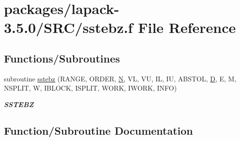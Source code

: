 \hypertarget{sstebz_8f}{}\section{packages/lapack-\/3.5.0/\+S\+R\+C/sstebz.f File Reference}
\label{sstebz_8f}
\subsection*{Functions/\+Subroutines}
\begin{DoxyCompactItemize}
\item 
subroutine \hyperlink{sstebz_8f_a931f74959abb55088a26c358deb5246d}{sstebz} (R\+A\+N\+G\+E, O\+R\+D\+E\+R, \hyperlink{polmisc_8c_a0240ac851181b84ac374872dc5434ee4}{N}, V\+L, V\+U, I\+L, I\+U, A\+B\+S\+T\+O\+L, \hyperlink{odrpack_8h_a7dae6ea403d00f3687f24a874e67d139}{D}, E, M, N\+S\+P\+L\+I\+T, W, I\+B\+L\+O\+C\+K, I\+S\+P\+L\+I\+T, W\+O\+R\+K, I\+W\+O\+R\+K, I\+N\+F\+O)
\begin{DoxyCompactList}\small\item\em {\bfseries S\+S\+T\+E\+B\+Z} \end{DoxyCompactList}\end{DoxyCompactItemize}


\subsection{Function/\+Subroutine Documentation}
\hypertarget{sstebz_8f_a931f74959abb55088a26c358deb5246d}{}
